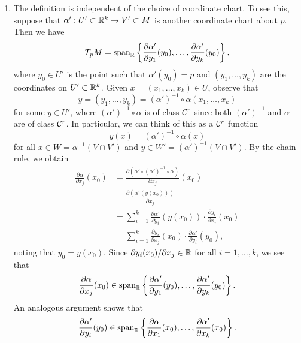 \begin{enumerate}[(1)]
    \item The definition is independent of the choice of coordinate chart. 
    To see this, suppose that $\alpha' : U' \subset \mathbb{R}^k 
    \to V' \subset M$ is another coordinate chart about $p$. Then we have 
    \[ T_pM = \operatorname{span}_{\mathbb{R}} \left\{ \frac{\partial \alpha'}{\partial y_1}(y_0), 
    \dots, \frac{\partial \alpha'}{\partial y_k}(y_0) \right\}, \] 
    where $y_0 \in U'$ is the point such that $\alpha'(y_0) = p$ and 
    $(y_1, \dots, y_k)$ are the coordinates 
    on $U' \subset \mathbb{R}^k$. Given $x = (x_1, \dots, x_k) \in U$, observe that
    \[ y = (y_1, \dots, y_k) = (\alpha')^{-1} \circ \alpha(x_1, \dots, x_k) \]
    for some $y \in U'$, where $(\alpha')^{-1} \circ \alpha$ is of class ${\cal C}^r$ 
    since both $(\alpha')^{-1}$ and $\alpha$ are of class ${\cal C}^r$. In particular, 
    we can think of this as a ${\cal C}^r$ function 
    \[ y(x) = (\alpha')^{-1} \circ \alpha(x) \] 
    for all $x \in W = \alpha^{-1}(V \cap V')$ and $y \in W' = (\alpha')^{-1}
    (V \cap V')$. By the chain rule, we obtain
    \begin{align*}
        \frac{\partial\alpha}{\partial x_j}(x_0) 
        &= \frac{\partial(\alpha' \circ (\alpha')^{-1} \circ \alpha)}{\partial x_j}(x_0) \\ 
        &= \frac{\partial(\alpha'(y(x_0)))}{\partial x_j} \\ 
        &= \sum_{i=1}^k \frac{\partial\alpha'}{\partial y_i} (y(x_0)) \cdot 
        \frac{\partial y_i}{\partial x_j}(x_0) \\ 
        &= \sum_{i=1}^k \frac{\partial y_i}{\partial x_j}(x_0) \cdot 
        \frac{\partial\alpha'}{\partial y_i}(y_0), 
    \end{align*}
    noting that $y_0 = y(x_0)$. Since $\partial y_i(x_0)/\partial x_j \in \mathbb{R}$ 
    for all $i = 1, \dots, k$, we see that 
    \[ \frac{\partial\alpha}{\partial x_j}(x_0) \in \operatorname{span}_{\mathbb{R}}
    \left\{ \frac{\partial \alpha'}{\partial y_1}(y_0), 
    \dots, \frac{\partial \alpha'}{\partial y_k}(y_0) \right\}. \] 
    An analogous argument shows that 
    \[ \frac{\partial\alpha'}{\partial y_i}(y_0) \in \operatorname{span}_{\mathbb{R}}
    \left\{ \frac{\partial \alpha}{\partial x_1}(x_0), 
    \dots, \frac{\partial \alpha'}{\partial x_k}(x_0) \right\}. \] 


\end{enumerate}
